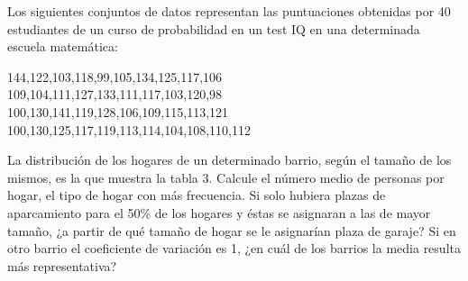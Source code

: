 \documentclass{exam}
\begin{document}
\begin{questions}
	\question Los siguientes conjuntos de datos representan las puntuaciones obtenidas por 40 estudiantes de un curso de probabilidad en un test IQ en una determinada escuela matemática:
	\begin{center}
		144,122,103,118,99,105,134,125,117,106\\
		109,104,111,127,133,111,117,103,120,98\\
		100,130,141,119,128,106,109,115,113,121\\
		100,130,125,117,119,113,114,104,108,110,112
	\end{center}
\question La distribución de los hogares de un determinado barrio, según el tamaño de los mismos, es la que muestra la tabla 3. Calcule el número medio de personas por hogar, el tipo de hogar con más frecuencia. Si solo hubiera plazas de aparcamiento para el 50\% de los hogares y éstas se asignaran a las de mayor tamaño, ¿a partir de qué tamaño de hogar se le asignarían plaza de garaje? Si en otro barrio el coeficiente de variación es 1, ¿en cuál de los barrios la media resulta más representativa?


\end{questions}
\end{document}
